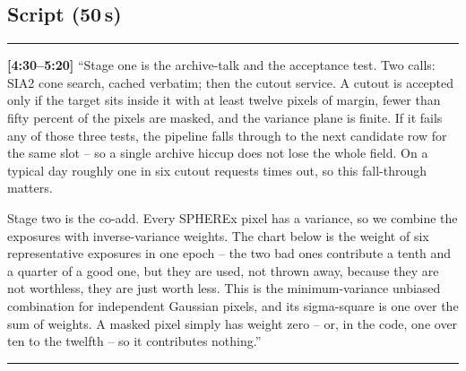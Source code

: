 \documentclass[11pt,a4paper]{article}
\begin{document}
\begin{center}
\end{center}

\subsection*{Script (50\,s)}
\noindent\rule{\linewidth}{0.3pt}\par\smallskip\noindent
\textbf{[4:30--5:20]} ``Stage one is the archive-talk and the acceptance test. Two calls: SIA2 cone
search, cached verbatim; then the cutout service. A cutout is accepted only if the target sits inside
it with at least twelve pixels of margin, fewer than fifty percent of the pixels are masked, and the
variance plane is finite. If it fails any of those three tests, the pipeline falls through to the next
candidate row for the same slot -- so a single archive hiccup does not lose the whole field. On a
typical day roughly one in six cutout requests times out, so this fall-through matters.

Stage two is the co-add. Every SPHEREx pixel has a variance, so we combine the exposures with
inverse-variance weights. The chart below is the weight of six representative exposures in one
epoch -- the two bad ones contribute a tenth and a quarter of a good one, but they are used, not
thrown away, because they are not worthless, they are just worth less. This is the minimum-variance
unbiased combination for independent Gaussian pixels, and its sigma-square is one over the sum of
weights. A masked pixel simply has weight zero -- or, in the code, one over ten to the twelfth -- so
it contributes nothing.''
\par\smallskip\noindent\rule{\linewidth}{0.3pt}
\end{document}
